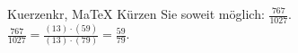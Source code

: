 \begin{MAufgabe}{Kuerzen}{kr, MaTeX}
K\"urzen Sie soweit m\"oglich: $\frac{767}{1027}$.\\ 
\ifLsg\MLoesung
\quad $\frac{767}{1027}=\frac{(13)\cdot(59)}{(13)\cdot(79)}=\frac{59}{79}$.\else\relax\fi
 \end{MAufgabe}